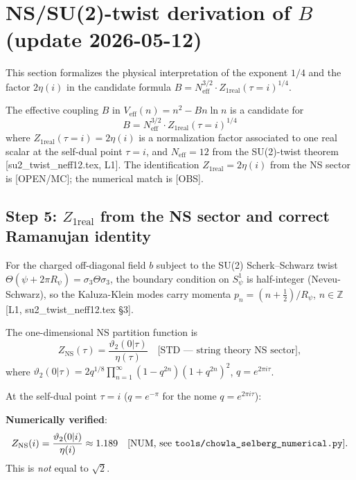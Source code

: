 \documentclass[12pt,a4paper]{article}
\begin{document}
\section{NS/SU(2)-twist derivation of $B$ (update 2026-05-12)}
\label{sec:ns_twist}

This section formalizes the physical interpretation of the exponent $1/4$ and
the factor $2\eta(i)$ in the candidate formula
\(B = N_{\mathrm{eff}}^{3/2}\cdot Z_{1\mathrm{real}}(\tau=i)^{1/4}\).

\begin{theorem}
\label{thm:B_ns_twist}
The effective coupling $B$ in $V_{\mathrm{eff}}(n) = n^2 - Bn\ln n$
is a candidate for
\[
B = N_{\mathrm{eff}}^{3/2} \cdot Z_{1\mathrm{real}}(\tau=i)^{1/4}
\]
where $Z_{1\mathrm{real}}(\tau=i) = 2\eta(i)$ is a normalization factor
associated to one real scalar at the self-dual point $\tau=i$, and
$N_{\mathrm{eff}}=12$ from the SU(2)-twist theorem
\textup{[su2\_twist\_neff12.tex, L1]}.
The identification $Z_{1\mathrm{real}}=2\eta(i)$ from the NS sector is
\textup{[OPEN/MC]}; the numerical match is \textup{[OBS]}.
\end{theorem}

\subsection*{Step 5: \(Z_{1\mathrm{real}}\) from the NS sector and correct Ramanujan identity}

For the charged off-diagonal field $b$ subject to the SU(2) Scherk--Schwarz
twist \(\Theta(\psi+2\pi R_\psi)=\sigma_3\Theta\sigma_3\), the boundary
condition on $S^1_\psi$ is half-integer (Neveu-Schwarz), so the
Kaluza-Klein modes carry momenta \(p_n = (n+\tfrac12)/R_\psi\),
\(n\in\mathbb{Z}\) [L1, su2\_twist\_neff12.tex \S3].

The one-dimensional NS partition function is
\[
Z_{\mathrm{NS}}(\tau) = \frac{\vartheta_2(0|\tau)}{\eta(\tau)}
\quad\text{[STD — string theory NS sector]},
\]
where \(\vartheta_2(0|\tau) = 2q^{1/8}\prod_{n=1}^\infty(1-q^{2n})(1+q^{2n})^2\),
\(q = e^{2\pi i\tau}\).

At the self-dual point $\tau = i$ ($q = e^{-\pi}$ for the nome
$q=e^{2\pi i\tau}$):

\noindent\textbf{Numerically verified}:
\[
Z_{\mathrm{NS}}(i) = \frac{\vartheta_2(0|i)}{\eta(i)} \approx 1.189
\quad\text{[NUM, see \texttt{tools/chowla\_selberg\_numerical.py}]}.
\]
This is \emph{not} equal to $\sqrt{2}$.
\end{document}
